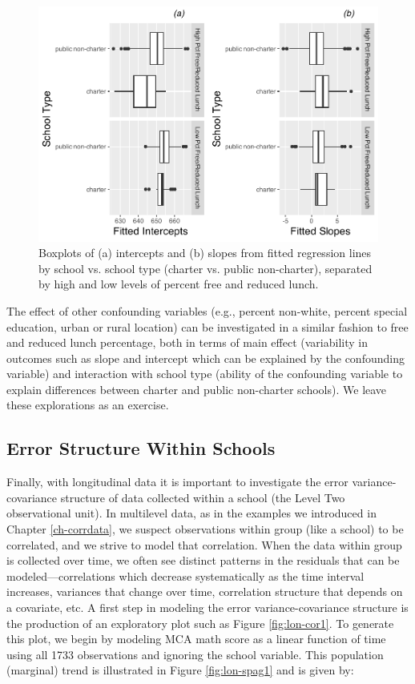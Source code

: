 \documentclass[
]{krantz}
\begin{document}
\begin{figure}

{\centering \includegraphics[width=0.6\linewidth]{bookdown-BeyondMLR_files/figure-latex/lon-boxmat1-1} 

}

\caption{Boxplots of (a) intercepts and (b) slopes from fitted regression lines by school vs. school type (charter vs. public non-charter), separated by high and low levels of percent free and reduced lunch.}\label{fig:lon-boxmat1}
\end{figure}

The effect of other confounding variables (e.g., percent non-white, percent special education, urban or rural location) can be investigated in a similar fashion to free and reduced lunch percentage, both in terms of main effect (variability in outcomes such as slope and intercept which can be explained by the confounding variable) and interaction with school type (ability of the confounding variable to explain differences between charter and public non-charter schools). We leave these explorations as an exercise.

\subsection{Error Structure Within Schools}\label{lineartwostageerror2}

Finally, with longitudinal data it is important to investigate the error variance-covariance structure of data collected within a school (the Level Two observational unit). In multilevel data, as in the examples we introduced in Chapter \ref{ch-corrdata}, we suspect observations within group (like a school) to be correlated, and we strive to model that correlation. When the data within group is collected over time, we often see distinct patterns in the residuals that can be modeled---correlations which decrease systematically as the time interval increases, variances that change over time, correlation structure that depends on a covariate, etc. A first step in modeling the error variance-covariance structure is the production of an exploratory plot such as Figure \ref{fig:lon-cor1}. To generate this plot, we begin by modeling MCA math score as a linear function of time using all 1733 observations and ignoring the school variable. This population (marginal) trend is illustrated in Figure \ref{fig:lon-spag1} and is given by:
\end{document}
